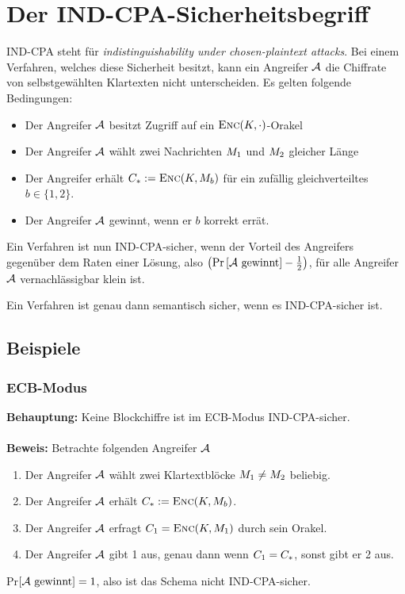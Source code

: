 \section{Der IND-CPA-Sicherheitsbegriff}
\label{def:ind-cpa}
IND-CPA steht für \emph{indistinguishability under chosen-plaintext attacks}. Bei einem Verfahren, welches diese Sicherheit besitzt, kann ein Angreifer $\mathcal{A}$
die Chiffrate von selbstgewählten Klartexten nicht unterscheiden. Es gelten folgende Bedingungen:
\begin{itemize}
\item Der Angreifer $\mathcal{A}$ besitzt Zugriff auf ein $\textsc{Enc}(K,\cdot)$-Orakel
\item Der Angreifer $\mathcal{A}$ wählt zwei Nachrichten $M_1$ und $M_2$ gleicher Länge
\item Der Angreifer erhält $C_* := \textsc{Enc}(K, M_{b})$  für ein zufällig gleichverteiltes $b \in \{1, 2\}$.
\item Der Angreifer $\mathcal{A}$ gewinnt, wenn er $b$ korrekt errät.
\end{itemize}
Ein Verfahren ist nun IND-CPA-sicher, wenn der Vorteil des Angreifers gegenüber dem Raten einer Lösung, also $ \left( \text{Pr} \left[ \mathcal{A} \text{
gewinnt} \right] - \frac{1}{2} \right)$, für alle Angreifer $\mathcal{A}$ vernachlässigbar klein ist.
\vspace{10pt}

\begin{theorem}
Ein Verfahren ist genau dann semantisch sicher, wenn es IND-CPA-sicher ist.
\end{theorem}

\subsection{Beispiele}
\subsubsection{ECB-Modus}
\textbf{Behauptung:} Keine Blockchiffre ist im ECB-Modus IND-CPA-sicher.~\\\\
\textbf{Beweis:} Betrachte folgenden Angreifer $\mathcal{A}$
\begin{enumerate}[Schr{i}tt 1:]
    \item Der Angreifer $\mathcal{A}$ wählt zwei Klartextblöcke $M_1 \neq M_2$ beliebig.
    \item Der Angreifer $\mathcal{A}$ erhält $C_* := \textsc{Enc}(K, M_{b})$.
    \item Der Angreifer $\mathcal{A}$ erfragt $C_1 = \textsc{Enc}(K, M_1)$ durch sein Orakel.
    \item Der Angreifer $\mathcal{A}$ gibt 1 aus, genau dann wenn $C_1 = C_*$, sonst gibt er 2 aus.
\end{enumerate}
Pr$\left[ \mathcal{A} \text{ gewinnt} \right] = 1$, also ist das Schema nicht IND-CPA-sicher.


